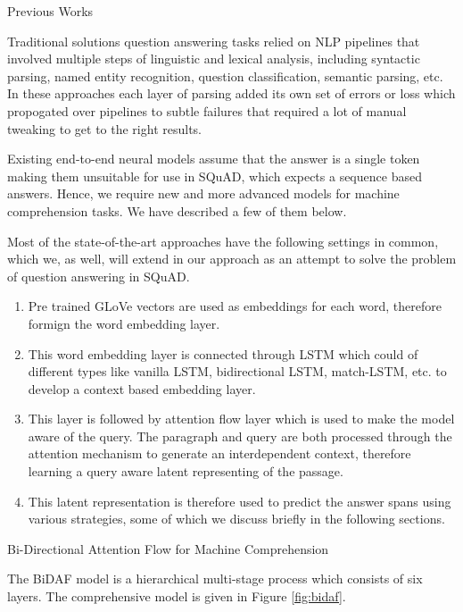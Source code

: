 \documentclass{article}
\begin{document}
\begin{psection}{Previous Works}

	Traditional solutions question answering tasks relied on NLP pipelines that involved multiple steps of linguistic and lexical analysis, including syntactic parsing, named entity recognition, question classification, semantic parsing, etc.
	In these approaches each layer of parsing added its own set of errors or loss which propogated over pipelines to subtle failures that required a lot of manual tweaking to get to the right results.

	Existing end-to-end neural models assume that the answer is a single token making them unsuitable for use in SQuAD, which expects a sequence based answers. Hence, we require new and more advanced models for machine comprehension tasks. We have described a few of them below.

	Most of the state-of-the-art approaches have the following settings in common, which we, as well, will extend in our approach as an attempt to solve the problem of question answering in SQuAD.

	\begin{enumerate}
		\item Pre trained GLoVe \citep{glove} vectors are used as embeddings for each word, therefore formign the word embedding layer.

		\item This word embedding layer is connected through LSTM which could of different types like vanilla LSTM, bidirectional LSTM, match-LSTM, etc. to develop a context based embedding layer.

		\item \sloppy
		    This layer is followed by attention flow layer which is used to make the model aware of the query.
			The paragraph and query are both processed through the attention mechanism to generate an interdependent context, therefore learning a query aware latent representing of the passage.

		\item This latent representation is therefore used to predict the answer spans using various strategies, some of which we discuss briefly in the following sections.
	\end{enumerate}

	\begin{psubsection}{Bi-Directional Attention Flow for Machine Comprehension}

		The BiDAF \citep{bidaf} model is a hierarchical multi-stage process which consists of six layers. The comprehensive model is given in Figure \ref{fig:bidaf}.


\end{psubsection}
\end{psection}
\end{document}
